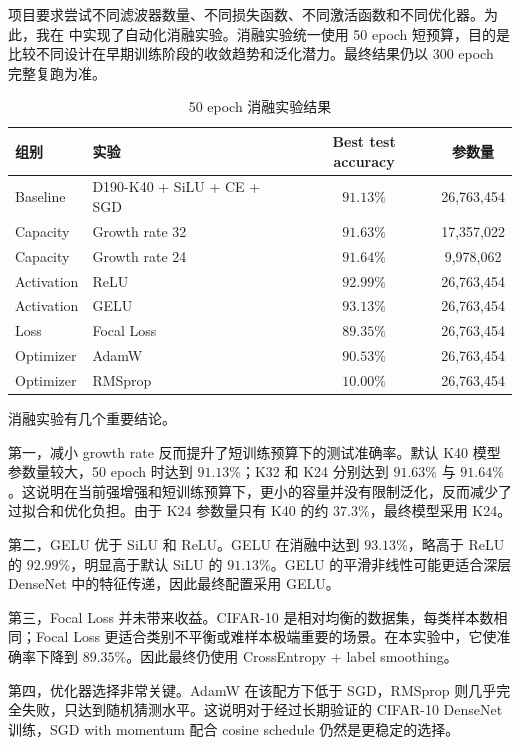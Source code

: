 \documentclass[UTF8,a4paper,11pt]{ctexart}
\begin{document}
项目要求尝试不同滤波器数量、不同损失函数、不同激活函数和不同优化器。为此，我在  中实现了自动化消融实验。消融实验统一使用 50 epoch 短预算，目的是比较不同设计在早期训练阶段的收敛趋势和泛化潜力。最终结果仍以 300 epoch 完整复跑为准。

\begin{table}[H]
  \centering
  \caption{50 epoch 消融实验结果}
  \label{tab:ablation_results}
  \begin{tabular}{llcc}
    \toprule
    组别 & 实验 & Best test accuracy & 参数量 \\
    \midrule
    Baseline & D190-K40 + SiLU + CE + SGD & $91.13\%$ & 26,763,454 \\
    Capacity & Growth rate 32 & $91.63\%$ & 17,357,022 \\
    Capacity & Growth rate 24 & $91.64\%$ & 9,978,062 \\
    Activation & ReLU & $92.99\%$ & 26,763,454 \\
    Activation & GELU & $\mathbf{93.13\%}$ & 26,763,454 \\
    Loss & Focal Loss & $89.35\%$ & 26,763,454 \\
    Optimizer & AdamW & $90.53\%$ & 26,763,454 \\
    Optimizer & RMSprop & $10.00\%$ & 26,763,454 \\
    \bottomrule
  \end{tabular}
\end{table}

消融实验有几个重要结论。

第一，减小 growth rate 反而提升了短训练预算下的测试准确率。默认 K40 模型参数量较大，50 epoch 时达到 $91.13\%$；K32 和 K24 分别达到 $91.63\%$ 与 $91.64\%$。这说明在当前强增强和短训练预算下，更小的容量并没有限制泛化，反而减少了过拟合和优化负担。由于 K24 参数量只有 K40 的约 $37.3\%$，最终模型采用 K24。

第二，GELU 优于 SiLU 和 ReLU。GELU 在消融中达到 $93.13\%$，略高于 ReLU 的 $92.99\%$，明显高于默认 SiLU 的 $91.13\%$。GELU 的平滑非线性可能更适合深层 DenseNet 中的特征传递，因此最终配置采用 GELU。

第三，Focal Loss 并未带来收益。CIFAR-10 是相对均衡的数据集，每类样本数相同；Focal Loss 更适合类别不平衡或难样本极端重要的场景。在本实验中，它使准确率下降到 $89.35\%$。因此最终仍使用 CrossEntropy + label smoothing。

第四，优化器选择非常关键。AdamW 在该配方下低于 SGD，RMSprop 则几乎完全失败，只达到随机猜测水平。这说明对于经过长期验证的 CIFAR-10 DenseNet 训练，SGD with momentum 配合 cosine schedule 仍然是更稳定的选择。
\end{document}
